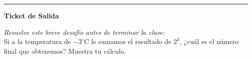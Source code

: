 \documentclass[12pt, letterpaper]{article}
\begin{document}
\vspace{1cm}
\hrule
\vspace{0.5cm}

\begin{center}
    \textbf{Ticket de Salida}
\end{center}

\noindent \textit{Resuelve este breve desafío antes de terminar la clase:} \\

\noindent Si a la temperatura de $-3^{\circ}\text{C}$ le sumamos el resultado de $2^3$, ¿cuál es el número final que obtenemos? Muestra tu cálculo.

\vspace{2cm}
\end{document}

